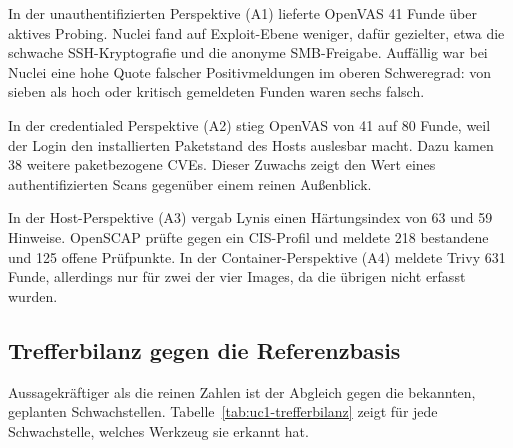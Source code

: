 In der unauthentifizierten Perspektive (A1) lieferte OpenVAS 41 Funde über aktives Probing. Nuclei
fand auf Exploit-Ebene weniger, dafür gezielter, etwa die schwache SSH-Kryptografie und die anonyme
SMB-Freigabe. Auffällig war bei Nuclei eine hohe Quote falscher Positivmeldungen im oberen
Schweregrad: von sieben als hoch oder kritisch gemeldeten Funden waren sechs falsch.

In der credentialed Perspektive (A2) stieg OpenVAS von 41 auf 80 Funde, weil der Login den
installierten Paketstand des Hosts auslesbar macht. Dazu kamen 38 weitere paketbezogene CVEs. Dieser
Zuwachs zeigt den Wert eines authentifizierten Scans gegenüber einem reinen Außenblick.

In der Host-Perspektive (A3) vergab Lynis einen Härtungsindex von 63 und 59 Hinweise. OpenSCAP prüfte
gegen ein CIS-Profil und meldete 218 bestandene und 125 offene Prüfpunkte. In der Container-Perspektive
(A4) meldete Trivy 631 Funde, allerdings nur für zwei der vier Images, da die übrigen nicht erfasst
wurden.

\subsection{Trefferbilanz gegen die Referenzbasis}
\label{subsec:uc1-trefferbilanz}

Aussagekräftiger als die reinen Zahlen ist der Abgleich gegen die bekannten, geplanten
Schwachstellen. Tabelle~\ref{tab:uc1-trefferbilanz} zeigt für jede Schwachstelle, welches Werkzeug
sie erkannt hat.

